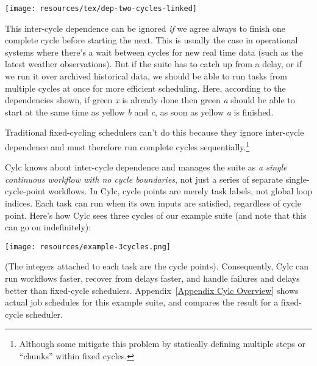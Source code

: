 \begin{center}
    \texttt{[image: resources/tex/dep-two-cycles-linked]}
\end{center}

This inter-cycle dependence can be ignored {\em if} we agree always to finish
one complete cycle before starting the next.  This is usually the case in
operational systems where there's a wait between cycles for new real time data
(such as the latest weather observations).  But if the suite has to catch up
from a delay, or if we run it over archived historical data, we should be able
to run tasks from multiple cycles at once for more efficient scheduling.  Here,
according to the dependencies shown, if green {\em x} is already done then
green {\em a} should be able to start at the same time as yellow {\em b}
and {\em c}, as soon as yellow {\em a} is finished.

Traditional fixed-cycling schedulers can't do this because they ignore
inter-cycle dependence and must therefore run complete cycles
sequentially.\footnote{Although some mitigate this problem by statically
defining multiple steps or ``chunks'' within fixed cycles.}

Cylc knows about inter-cycle dependence and manages the suite as {\em a single
continuous workflow with no cycle boundaries}, not just a series of separate
single-cycle-point workflows.  In Cylc, cycle points are merely task labels,
not global loop indices.  Each task can run when its own inputs are satisfied,
regardless of cycle point.  Here's how Cylc sees three cycles of our example
suite (and note that this can go on indefinitely):

\begin{center}
    \texttt{[image: resources/example-3cycles.png]}
\end{center}

(The integers attached to each task are the cycle points). Consequently, Cylc can
run workflows faster, recover from delays faster, and handle failures and
delays better than fixed-cycle schedulers.  Appendix~\ref{Appendix Cylc
Overview} shows actual job schedules for this example suite, and compares the
result for a fixed-cycle scheduler.
